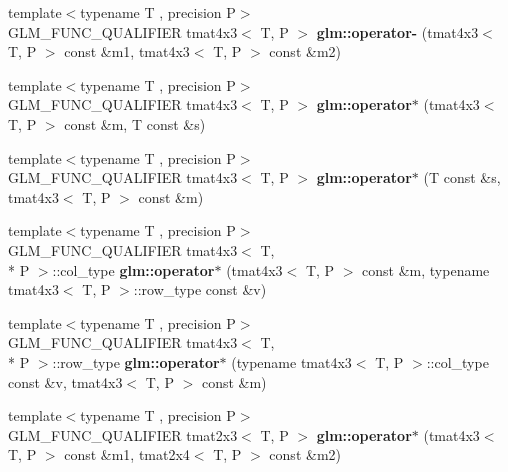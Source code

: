 \begin{DoxyCompactItemize}
\item 
\hypertarget{namespaceglm_a3366016f32730b6590831628678f7a75}{{\footnotesize template$<$typename T , precision P$>$ }\\G\-L\-M\-\_\-\-F\-U\-N\-C\-\_\-\-Q\-U\-A\-L\-I\-F\-I\-E\-R tmat4x3$<$ T, P $>$ {\bfseries glm\-::operator-\/} (tmat4x3$<$ T, P $>$ const \&m1, tmat4x3$<$ T, P $>$ const \&m2)}\label{namespaceglm_a3366016f32730b6590831628678f7a75}

\item 
\hypertarget{namespaceglm_a4e17c31ba0dc7ad185b218ee3dda2195}{{\footnotesize template$<$typename T , precision P$>$ }\\G\-L\-M\-\_\-\-F\-U\-N\-C\-\_\-\-Q\-U\-A\-L\-I\-F\-I\-E\-R tmat4x3$<$ T, P $>$ {\bfseries glm\-::operator$\ast$} (tmat4x3$<$ T, P $>$ const \&m, T const \&s)}\label{namespaceglm_a4e17c31ba0dc7ad185b218ee3dda2195}

\item 
\hypertarget{namespaceglm_ae2f835ca42b71dfa2f26d44560209da6}{{\footnotesize template$<$typename T , precision P$>$ }\\G\-L\-M\-\_\-\-F\-U\-N\-C\-\_\-\-Q\-U\-A\-L\-I\-F\-I\-E\-R tmat4x3$<$ T, P $>$ {\bfseries glm\-::operator$\ast$} (T const \&s, tmat4x3$<$ T, P $>$ const \&m)}\label{namespaceglm_ae2f835ca42b71dfa2f26d44560209da6}

\item 
\hypertarget{namespaceglm_ab8bb5a16d976817057cca7d1ec66733c}{{\footnotesize template$<$typename T , precision P$>$ }\\G\-L\-M\-\_\-\-F\-U\-N\-C\-\_\-\-Q\-U\-A\-L\-I\-F\-I\-E\-R tmat4x3$<$ T, \\*
P $>$\-::col\-\_\-type {\bfseries glm\-::operator$\ast$} (tmat4x3$<$ T, P $>$ const \&m, typename tmat4x3$<$ T, P $>$\-::row\-\_\-type const \&v)}\label{namespaceglm_ab8bb5a16d976817057cca7d1ec66733c}

\item 
\hypertarget{namespaceglm_a214d9119a6b9cf32b547306ebf2b96bb}{{\footnotesize template$<$typename T , precision P$>$ }\\G\-L\-M\-\_\-\-F\-U\-N\-C\-\_\-\-Q\-U\-A\-L\-I\-F\-I\-E\-R tmat4x3$<$ T, \\*
P $>$\-::row\-\_\-type {\bfseries glm\-::operator$\ast$} (typename tmat4x3$<$ T, P $>$\-::col\-\_\-type const \&v, tmat4x3$<$ T, P $>$ const \&m)}\label{namespaceglm_a214d9119a6b9cf32b547306ebf2b96bb}

\item 
\hypertarget{namespaceglm_af9121f804d71e079cbe1349c6715e869}{{\footnotesize template$<$typename T , precision P$>$ }\\G\-L\-M\-\_\-\-F\-U\-N\-C\-\_\-\-Q\-U\-A\-L\-I\-F\-I\-E\-R tmat2x3$<$ T, P $>$ {\bfseries glm\-::operator$\ast$} (tmat4x3$<$ T, P $>$ const \&m1, tmat2x4$<$ T, P $>$ const \&m2)}\label{namespaceglm_af9121f804d71e079cbe1349c6715e869}


\end{DoxyCompactItemize}
